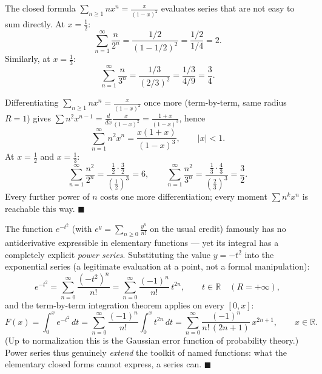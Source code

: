 \documentclass[11pt]{report}
\begin{document}
\begin{exbox}
The closed formula $\sum_{n\geq1} n x^n = \tfrac{x}{(1-x)^2}$ evaluates series that are not easy to sum directly. At $x = \tfrac12$:
\[
\sum_{n=1}^\infty \frac{n}{2^n} = \frac{1/2}{(1 - 1/2)^2} = \frac{1/2}{1/4} = 2.
\]
Similarly, at $x = \tfrac13$:
\[
\sum_{n=1}^\infty \frac{n}{3^n} = \frac{1/3}{(2/3)^2} = \frac{1/3}{4/9} = \frac34. \tag*{$\blacksquare$}
\]
\end{exbox}

\begin{exbox}
Differentiating $\sum_{n \geq 1} n x^n = \tfrac{x}{(1-x)^2}$ once more (term-by-term, same radius $R = 1$) gives $\sum n^2 x^{n-1} = \tfrac{d}{dx} \tfrac{x}{(1-x)^2} = \tfrac{1+x}{(1-x)^3}$, hence
\[
\sum_{n=1}^\infty n^2 x^n = \frac{x(1+x)}{(1-x)^3}, \qquad |x| < 1.
\]
At $x = \tfrac12$ and $x = \tfrac13$:
\[
\sum_{n=1}^\infty \frac{n^2}{2^n} = \frac{\tfrac12 \cdot \tfrac32}{(\tfrac12)^3} = 6, \qquad
\sum_{n=1}^\infty \frac{n^2}{3^n} = \frac{\tfrac13 \cdot \tfrac43}{(\tfrac23)^3} = \frac32.
\]
Every further power of $n$ costs one more differentiation; every moment $\sum n^k x^n$ is reachable this way. \hfill $\blacksquare$
\end{exbox}

\begin{exbox}
The function $e^{-t^2}$ (with $e^y = \sum_{n\geq0} \tfrac{y^n}{n!}$ on the usual credit) famously has no antiderivative expressible in elementary functions --- yet its integral has a completely explicit \emph{power series}. Substituting the value $y = -t^2$ into the exponential series (a legitimate evaluation at a point, not a formal manipulation):
\[
e^{-t^2} = \sum_{n=0}^\infty \frac{(-t^2)^n}{n!} = \sum_{n=0}^\infty \frac{(-1)^n}{n!}\, t^{2n}, \qquad t \in \mathbb{R} \quad (R = +\infty),
\]
and the term-by-term integration theorem applies on every $[0, x]$:
\[
F(x) = \int_0^x e^{-t^2}\,dt = \sum_{n=0}^\infty \frac{(-1)^n}{n!} \int_0^x t^{2n}\,dt = \sum_{n=0}^\infty \frac{(-1)^n}{n!\,(2n+1)}\, x^{2n+1}, \qquad x \in \mathbb{R}.
\]
(Up to normalization this is the Gaussian error function of probability theory.) Power series thus genuinely \emph{extend} the toolkit of named functions: what the elementary closed forms cannot express, a series can. \hfill $\blacksquare$
\end{exbox}
\end{document}
